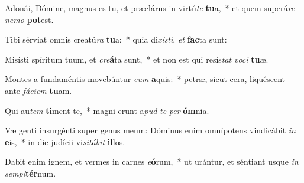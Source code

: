 \item Adonái, Dómine, magnus es tu, et præclárus in virtú\textit{te} \textbf{tu}a,~* et quem superá\textit{re} \textit{ne}\textit{mo} \textbf{pot}est.
\item Tibi sérviat omnis creatú\textit{ra} \textbf{tu}a:~* quia di\textit{xís}\textit{ti}, \textit{et} \textbf{fac}ta sunt:
\item Misísti spíritum tuum, et \textit{cre}\textbf{á}ta sunt,~* et non est qui resís\textit{tat} \textit{vo}\textit{ci} \textbf{tu}æ.
\item Montes a fundaméntis movebúntur \textit{cum} \textbf{a}quis:~* petræ, sicut cera, liquéscent ante \textit{fá}\textit{ci}\textit{em} \textbf{tu}am.
\item Qui au\textit{tem} \textbf{ti}ment te,~* magni erunt a\textit{pud} \textit{te} \textit{per} \textbf{óm}nia.
\item Væ genti insurgénti super genus meum: Dóminus enim omnípotens vindicábit \textit{in} \textbf{e}is,~* in die judícii vi\textit{si}\textit{tá}\textit{bit} \textbf{il}los.
\item Dabit enim ignem, et vermes in carnes \textit{e}\textbf{ó}rum,~* ut urántur, et séntiant usque \textit{in} \textit{sem}\textit{pi}\textbf{tér}num.
